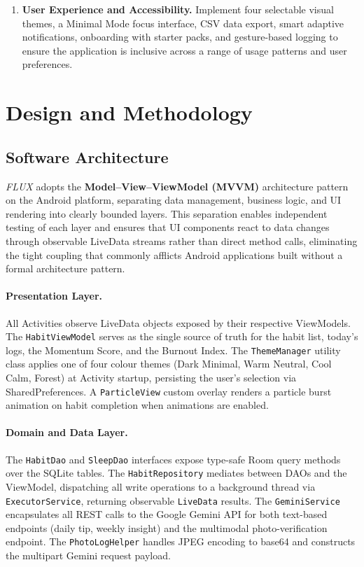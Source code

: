 \documentclass[12pt,a4paper]{article}
\newcommand{\FL}{\textit{FLUX}}
\begin{document}
\begin{enumerate}[leftmargin=1.5em, itemsep=6pt]
    \item \textbf{User Experience and Accessibility.}
    Implement four selectable visual themes, a Minimal Mode focus interface, CSV
    data export, smart adaptive notifications, onboarding with starter packs, and
    gesture-based logging to ensure the application is inclusive across a range of
    usage patterns and user preferences.

\end{enumerate}

\section{Design and Methodology}

\subsection{Software Architecture}

\FL{} adopts the \textbf{Model--View--ViewModel (MVVM)} architecture pattern on
the Android platform, separating data management, business logic, and UI rendering
into clearly bounded layers. This separation enables independent testing of each
layer and ensures that UI components react to data changes through observable
LiveData streams rather than direct method calls, eliminating the tight coupling
that commonly afflicts Android applications built without a formal architecture
pattern.

\paragraph{Presentation Layer.}
All Activities observe LiveData objects exposed by their respective ViewModels.
The \texttt{HabitViewModel} serves as the single source of truth for the habit
list, today's logs, the Momentum Score, and the Burnout Index. The
\texttt{ThemeManager} utility class applies one of four colour themes
(Dark Minimal, Warm Neutral, Cool Calm, Forest) at Activity startup, persisting
the user's selection via SharedPreferences. A \texttt{ParticleView} custom overlay
renders a particle burst animation on habit completion when animations are enabled.

\paragraph{Domain and Data Layer.}
The \texttt{HabitDao} and \texttt{SleepDao} interfaces expose type-safe Room
query methods over the SQLite tables. The \texttt{HabitRepository} mediates between
DAOs and the ViewModel, dispatching all write operations to a background thread
via \texttt{ExecutorService}, returning observable \texttt{LiveData} results.
The \texttt{GeminiService} encapsulates all REST calls to the Google Gemini API
for both text-based endpoints (daily tip, weekly insight) and the multimodal
photo-verification endpoint. The \texttt{PhotoLogHelper} handles JPEG encoding
to base64 and constructs the multipart Gemini request payload.
\end{document}
